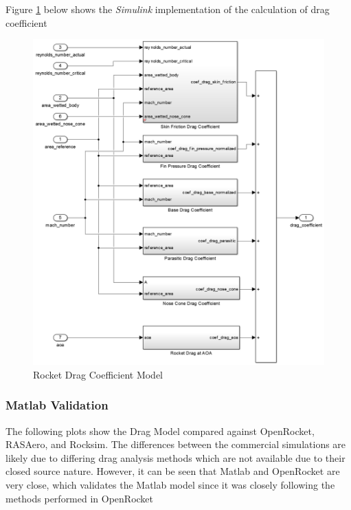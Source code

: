 \documentclass[]{article}
\begin{document}
\clearpage

Figure \ref{rocket_drag_coefficients_label} below shows the
\emph{Simulink} implementation of the calculation of drag coefficient

\begin{figure}[htbp]
\centering
\includegraphics{images/rocket_drag_coefficient.png}
\caption{Rocket Drag Coefficient Model
\label{rocket_drag_coefficients_label}}
\end{figure}

\subsubsection{Matlab Validation}\label{matlab-validation}

The following plots show the Drag Model compared against OpenRocket,
RASAero, and Rocksim. The differences between the commercial simulations
are likely due to differing drag analysis methods which are not
available due to their closed source nature. However, it can be seen
that Matlab and OpenRocket are very close, which validates the Matlab
model since it was closely following the methods performed in OpenRocket
\end{document}
